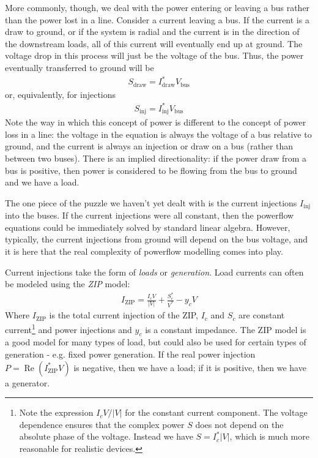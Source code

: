 \documentclass[11pt]{article}
\newcommand{\re}[1]{\ensuremath{\operatorname{Re}(#1)}}
\begin{document}
More commonly, though, we deal with the power entering or leaving a bus rather than the power lost in a line. Consider a current leaving a bus. If the current is a draw to ground, or if the system is radial and the current is in the direction of the downstream loads, all of this current will eventually end up at ground. The voltage drop in this process will just be the voltage of the bus. Thus, the power eventually transferred to ground will be 
\begin{align}
	S_\text{draw} = I_\text{draw}^*V_\text{bus}
\end{align}
or, equivalently, for injections
\begin{align}
	S_\text{inj} = I_\text{inj}^*V_\text{bus}
\end{align}
Note the way in which this concept of power is different to the concept of power loss in a line: the voltage in the equation is always the voltage of a bus relative to ground, and the current is always an injection or draw on a bus (rather than between two buses). There is an implied directionality: if the power draw from a bus is positive, then power is considered to be flowing from the bus to ground and we have a load.

The one piece of the puzzle we haven't yet dealt with is the current injections $I_\text{inj}$ into the buses. If the current injections were all constant, then the powerflow equations could be immediately solved by standard linear algebra. However, typically, the current injections from ground will depend on the bus voltage, and it is here that the real complexity of powerflow modelling comes into play.

Current injections take the form of \emph{loads} or \emph{generation}. Load currents can often be modeled using the \emph{ZIP} model:
\begin{align}
	I_\text{ZIP} = \frac{I_cV}{|V|} + \frac{S^*_c}{V^*} - y_cV
\end{align}
Where $I_\text{ZIP}$ is the total current injection of the ZIP, $I_c$ and $S_c$ are constant current\footnote{Note the expression $I_cV/|V|$ for the constant current component. The voltage dependence ensures that the complex power $S$ does not depend on the absolute phase of the voltage. Instead we have $S = I^*_c |V|$, which is much more reasonable for realistic devices.} and power injections and $y_c$ is a constant impedance. The ZIP model is a good model for many types of load, but could also be used for certain types of generation - e.g. fixed power generation. If the real power injection $P = \re{I_\text{ZIP}^*V}$ is negative, then we have a load; if it is positive, then we have a generator.
\end{document}
